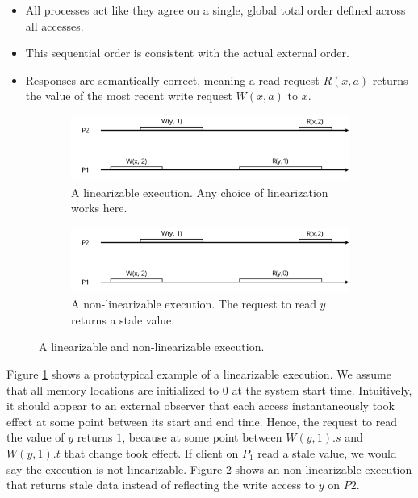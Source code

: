 \documentclass[]             %
{NASA}                       %
\theoremstyle{definition}
\providecommand{\tightlist}{%
  \setlength{\itemsep}{0pt}\setlength{\parskip}{0pt}}
\begin{document}
\begin{itemize}
\tightlist
\item
  All processes act like they agree on a single, global total order
  defined across all accesses.
\item
  This sequential order is consistent with the actual external order.
\item
  Responses are semantically correct, meaning a read request \(R(x, a)\)
  returns the value of the most recent write request \(W(x, a)\) to
  \(x\).
\end{itemize}

\begin{figure} \begin{subfigure}[a]{1\textwidth} \center
     \includegraphics[scale=0.4]{images/linear1.png} \caption{A
     linearizable execution. Any choice of linearization works here.}
     \label{fig:linear_example11} \end{subfigure}
     \begin{subfigure}[b]{1\textwidth} \center
     \includegraphics[scale=0.4]{images/nonlinear0.png} \caption{A
     non-linearizable execution. The request to read $y$ returns a
     stale value. } \label{fig:linear_example12} \end{subfigure}
     \caption{A linearizable and non-linearizable execution.}
     \label{fig:linear_example1} \end{figure}

Figure \ref{fig:linear_example11} shows a prototypical example of a
linearizable execution. We assume that all memory locations are
initialized to \(0\) at the system start time. Intuitively, it should
appear to an external observer that each access instantaneously took
effect at some point between its start and end time. Hence, the request
to read the value of \(y\) returns \(1\), because at some point between
\(W(y,1).s\) and \(W(y,1).t\) that change took effect. If client on
\(P_1\) read a stale value, we would say the execution is not
linearizable. Figure \ref{fig:linear_example12} shows an
non-linearizable execution that returns stale data instead of reflecting
the write access to \(y\) on \(P2\).
\end{document}
